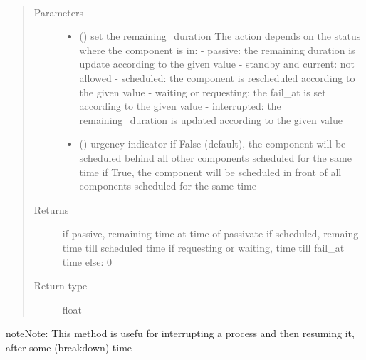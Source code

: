 \documentclass[letterpaper,10pt,english]{sphinxmanual}
\begin{document}
\begin{fulllineitems}

\begin{fulllineitems}
\label{\detokenize{Reference:salabim.Component.remaining_duration}}~\begin{quote}\begin{description}
\item[{Parameters}] \leavevmode\begin{itemize}
\item {} 
 () \textendash{} set the remaining\_duration 
The action depends on the status where the component is in: 
- passive: the remaining duration is update according to the given value 
- standby and current: not allowed 
- scheduled: the component is rescheduled according to the given value 
- waiting or requesting: the fail\_at is set according to the given value 
- interrupted: the remaining\_duration is updated according to the given value 

\item {} 
 () \textendash{} urgency indicator 
if False (default), the component will be scheduled
behind all other components scheduled
for the same time 
if True, the component will be scheduled
in front of all components scheduled
for the same time

\end{itemize}

\item[{Returns}] \leavevmode
{} \textendash{} if passive, remaining time at time of passivate 
if scheduled, remaing time till scheduled time 
if requesting or waiting, time till fail\_at time 
else: 0

\item[{Return type}] \leavevmode
float

\end{description}\end{quote}

\begin{sphinxadmonition}{note}{Note:}
This method is usefu for interrupting a process and then resuming it,
after some (breakdown) time
\end{sphinxadmonition}


\end{fulllineitems}
\end{fulllineitems}
\end{document}
